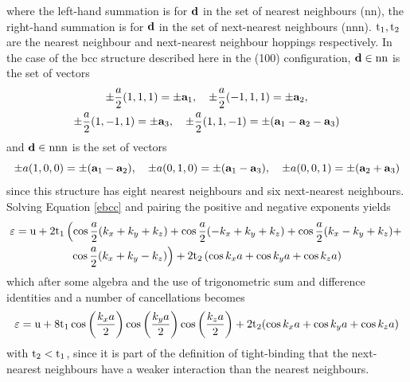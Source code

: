 \documentclass[a4paper, 12pt]{article}
\begin{document}
		where the left-hand summation is for ${\bf d}$ in the set of nearest neighbours (nn), the right-hand summation is for ${\bf d}$ in the set of next-nearest neighbours (nnn). $\rm t_1, t_2$ are the nearest neighbour and next-nearest neighbour hoppings respectively.
		In the case of the \gls{bcc} structure described here in the (100) configuration, ${\bf d} \in \rm nn$ is the set of vectors\\ 
		\begin{gather*}
			\pm \frac{a}{2}(1,1,1) = \pm {\bf a}_1,\quad \pm\frac{a}{2}(-1,1,1)=\pm {\bf a}_2,\\\pm \frac{a}{2}(1,-1,1)=\pm {\bf a}_3,\quad \pm \frac{a}{2}(1,1,-1)=\pm({\bf a}_1-{\bf a}_2-{\bf a}_3)
		\end{gather*}
		and ${\bf d}\in \rm nnn$ is the set of vectors 
		\begin{equation*}
			\pm a(1,0,0) = \pm ({\bf a}_1-{\bf a}_2), \quad\pm a(0,1,0)=\pm ({\bf a}_1-{\bf a}_3), \quad\pm a(0,0,1) =\pm ({\bf a}_2+{\bf a}_3)
		\end{equation*}
		since this structure has eight nearest neighbours and six next-nearest neighbours.
		Solving Equation \eqref{ebcc} and pairing the positive and negative exponents yields 
		\begin{multline}
			\varepsilon = {\rm u} + 2{\rm t}_1\left(\cos\frac{a}{2}(k_x+k_y+k_z)+\cos\frac{a}{2}(-k_x+k_y+k_z)+\cos\frac{a}{2}(k_x-k_y+k_z) + \right.\\\left.\cos\frac{a}{2}(k_x+k_y-k_z)\right)+2{\rm t}_2\left(\cos k_x a+\cos k_y a+\cos k_z a \right)
		\end{multline}
		which after some algebra and the use of trigonometric sum and difference identities and a number of cancellations becomes
		\begin{equation}
			\varepsilon={\rm u} + 8{\rm t}_1\cos\left(\frac{k_x a}{2}\right)\cos\left(\frac{k_y a}{2}\right)\cos\left(\frac{k_z a}{2}\right) + 2{\rm t}_2(\cos k_x a + \cos k_y a + \cos k_z a)
		\end{equation}
		with $\rm t_2<t_1$, since it is part of the definition of tight-binding that the next-nearest neighbours have a weaker interaction than the nearest neighbours.
\end{document}
